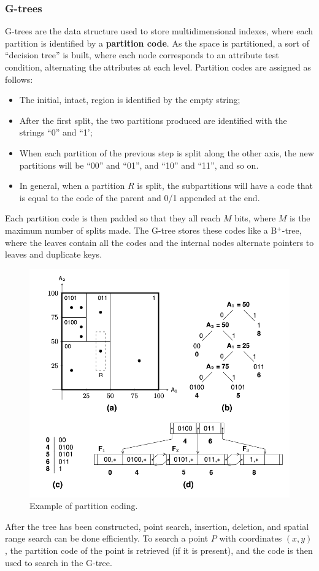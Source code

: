 \subsubsection{G-trees}

G-trees are the data structure used to store multidimensional indexes, where each partition is identified by a \textbf{partition code}. As the space is partitioned, a sort of ``decision tree'' is built, where each node corresponds to an attribute test condition, alternating the attributes at each level. Partition codes are assigned as follows:
\begin{itemize}
    \item The initial, intact, region is identified by the empty string;

    \item After the first split, the two partitions produced are identified with the strings ``0'' and ``1';

    \item When each partition of the previous step is split along the other axis, the new partitions will be ``00'' and ``01'', and ``10'' and ``11'', and so on.

    \item In general, when a partition $R$ is split, the subpartitions will have a code that is equal to the code of the parent and 0/1 appended at the end.
\end{itemize}
Each partition code is then padded so that they all reach $M$ bits, where $M$ is the maximum number of splits made. The G-tree stores these codes like a B$^+$-tree, where the leaves contain all the codes and the internal nodes alternate pointers to leaves and duplicate keys.
\begin{figure}[ht]
    \centering
    \includegraphics[width=0.5\linewidth]{img/G-tree.png}
    \caption{Example of partition coding.}
    \label{fig:G-tree}
\end{figure}
After the tree has been constructed, point search, insertion, deletion, and spatial range search can be done efficiently. To search a point $P$ with coordinates $(x, y)$, the partition code of the point is retrieved (if it is present), and the code is then used to search in the G-tree.

